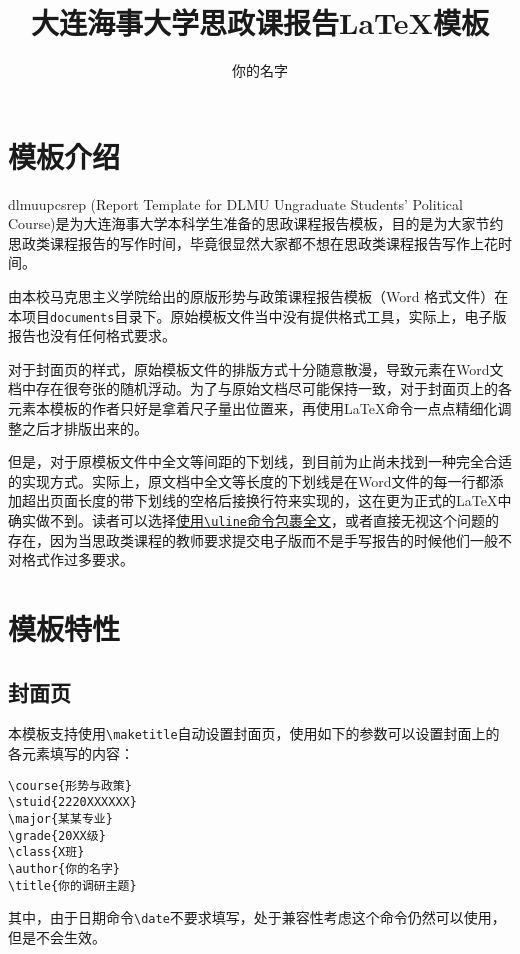 \documentclass[12pt]{dlmuupcsrep}
\author{你的名字}
\title{大连海事大学思政课报告\LaTeX 模板}
\begin{document}
\maketitle
\tableofcontents %

\section{模板介绍}

dlmuupcsrep (Report Template for DLMU Ungraduate Students' Political Course)是为大连海事大学本科学生准备的思政课程报告模板，目的是为大家节约思政类课程报告的写作时间，毕竟很显然大家都不想在思政类课程报告写作上花时间。

由本校马克思主义学院给出的原版形势与政策课程报告模板（Word 格式文件）在本项目\texttt{documents}目录下。原始模板文件当中没有提供格式工具，实际上，电子版报告也没有任何格式要求。

对于封面页的样式，原始模板文件的排版方式十分随意散漫，导致元素在Word文档中存在很夸张的随机浮动。为了与原始文档尽可能保持一致，对于封面页上的各元素本模板的作者只好是拿着尺子量出位置来，再使用\LaTeX 命令一点点精细化调整之后才排版出来的。

但是，对于原模板文件中全文等间距的下划线，到目前为止尚未找到一种完全合适的实现方式。实际上，原文档中全文等长度的下划线是在Word文件的每一行都添加超出页面长度的带下划线的空格后接换行符来实现的，这在更为正式的\LaTeX 中确实做不到。读者可以选择\uline{使用\texttt{\textbackslash uline}命令包裹全文}，或者直接无视这个问题的存在，因为当思政类课程的教师要求提交电子版而不是手写报告的时候他们一般不对格式作过多要求。

\section{模板特性}

\subsection{封面页}

本模板支持使用\texttt{\textbackslash maketitle}自动设置封面页，使用如下的参数可以设置封面上的各元素填写的内容：

\begin{verbatim}
\course{形势与政策}
\stuid{2220XXXXXX}
\major{某某专业}
\grade{20XX级}
\class{X班}
\author{你的名字}
\title{你的调研主题}
\end{verbatim}

其中，由于日期命令\texttt{\textbackslash date}不要求填写，处于兼容性考虑这个命令仍然可以使用，但是不会生效。
\end{document}
